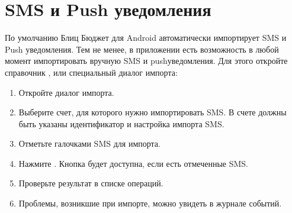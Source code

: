 \documentclass[a4paper,10pt,russian]{sphinxmanual}
\begin{document}
\section{SMS и Push уведомления}
\label{\detokenize{import:sms-push}}
\sphinxAtStartPar
По умолчанию Блиц Бюджет для Android автоматически импортирует SMS и Push уведомления. Тем не менее, в приложении есть возможность
в любой момент импортировать вручную SMS и push\sphinxhyphen{}уведомления. Для этого откройте справочник ,  или
специальный диалог импорта:
\begin{enumerate}
%
\item {} 
\sphinxAtStartPar
Откройте диалог импорта.

\item {} 
\sphinxAtStartPar
Выберите счет, для которого нужно импортировать SMS. В счете должны быть указаны идентификатор и настройка импорта SMS.

\item {} 
\sphinxAtStartPar
Отметьте галочками SMS для импорта.

\item {} 
\sphinxAtStartPar
Нажмите . Кнопка будет доступна, если есть отмеченные SMS.

\item {} 
\sphinxAtStartPar
Проверьте результат в списке операций.

\item {} 
\sphinxAtStartPar
Проблемы, возникшие при импорте, можно увидеть в журнале событий.

\end{enumerate}

\noindent{}
\noindent{}
\noindent{}
\noindent{}
\noindent{}
\noindent{}
\noindent{}
\noindent{}
\end{document}
